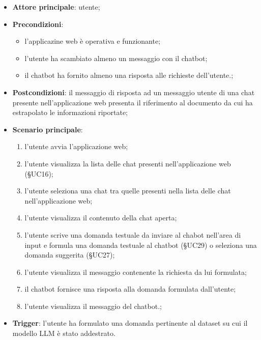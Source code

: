 \documentclass[10pt, a4paper]{article}
\begin{document}
    \begin{itemize}
        \item \textbf{Attore principale}: utente;
        \item \textbf{Precondizioni}: 
        \begin{itemize}
            \item l'applicazine web è operativa e funzionante;
            \item l'utente ha scambiato almeno un messaggio con il chatbot;
            \item il chatbot ha fornito almeno una risposta alle richieste dell'utente.;
        \end{itemize}
        \item \textbf{Postcondizioni}: il messaggio di risposta ad un messaggio utente di una chat presente nell'applicazione web presenta il riferimento al documento da cui ha estrapolato le informazioni riportate;
        \item \textbf{Scenario principale}:
            \begin{enumerate}
                \item l'utente avvia l'applicazione web;
                \item l'utente visualizza la lista delle chat presenti nell'applicazione web (\S UC16);
                \item l'utente seleziona una chat tra quelle presenti nella lista delle chat nell'applicazione web;
                \item l'utente visualizza il contenuto della chat aperta;
                \item l'utente scrive una domanda testuale da inviare al chabot nell'area di input e formula una domanda testuale al chatbot (\S UC29) o seleziona una domanda suggerita (\S UC27);
                \item l'utente visualizza il messaggio contenente la richiesta da lui formulata;
                \item il chatbot fornisce una risposta alla domanda formulata dall'utente;
                \item l'utente visualizza il messaggio del chatbot.;
            \end{enumerate}
        \item \textbf{Trigger}: l'utente ha formulato una domanda pertinente al dataset su cui il modello LLM è stato addestrato.
    \end{itemize}
\end{document}
